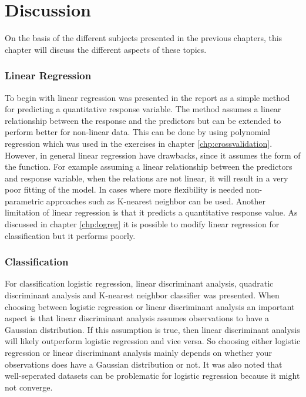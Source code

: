 \chapter{Discussion}
\label{chp:disc}
On the basis of the different subjects presented in the previous chapters, this chapter will discuss the different aspects of these  topics.

\subsection{Linear Regression}

To begin with linear regression was presented in the report as a simple method for predicting a quantitative response variable. The method assumes a linear relationship between the response and the predictors but can be extended to perform better for non-linear data. This can be done by using polynomial regression which was used in the exercises in chapter \ref{chp:crossvalidation}. However, in general linear regression have drawbacks, since it assumes the form of the function. For example assuming a linear relationship between the predictors and response variable, when the relations are not linear, it will result in a very poor fitting of the model. In cases where more flexibility is needed non-parametric approaches such as K-nearest neighbor can be used. Another limitation of linear regression is that it predicts a quantitative response value. As discussed in chapter \ref{chp:logreg} it is possible to modify linear regression for classification but it performs poorly.

\subsection{Classification}

For classification logistic regression, linear discriminant analysis, quadratic discriminant analysis and K-nearest neighbor classifier was presented. When choosing between logistic regression or linear discriminant analysis an important aspect is that linear discriminant analysis assumes observations to have a Gaussian distribution. If this assumption is true, then linear discriminant analysis will likely outperform logistic regression and vice versa. So choosing either logistic regression or linear discriminant analysis mainly depends on whether your observations does have a Gaussian distribution or not. It was also noted that well-seperated datasets can be problematic for logistic regression because it might not converge.
 
